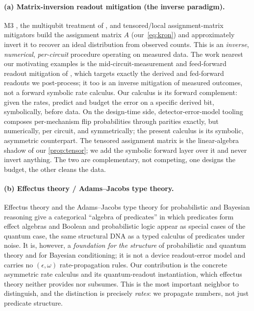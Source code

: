 \documentclass[a4paper,onecolumn,unpublished,nopdfoutputerror,allowtoday]{quantumarticle}
\numberwithin{equation}{section}
\theoremstyle{plain}
\theoremstyle{definition}
\theoremstyle{remark}
\newcommand{\eps}{\epsilon}
\begin{document}
\paragraph{(a) Matrix-inversion readout mitigation (the inverse paradigm).}
M3 \citep{nation2021m3}, the multiqubit treatment of
\citet{bravyi2021mitigating}, and tensored/local assignment-matrix mitigators
build the assignment matrix $A$ (our~\eqref{eq:kron}) and approximately invert it
to recover an ideal distribution from observed counts. This is an \emph{inverse},
\emph{numerical}, \emph{per-circuit} procedure operating on measured data. The
work nearest our motivating examples is the mid-circuit-measurement and
feed-forward readout mitigation of \citet{koh2024readout}, which targets exactly
the derived and fed-forward readouts we post-process; it too is an inverse
mitigation of measured outcomes, not a forward symbolic rate calculus. Our
calculus is its forward complement: given the rates, predict and budget the error
on a specific derived bit, symbolically, before data. On the design-time side,
detector-error-model tooling \citep{gidney2021stim} composes per-mechanism flip
probabilities through parities exactly, but numerically, per circuit, and
symmetrically; the present calculus is its symbolic, asymmetric counterpart.
The tensored assignment
matrix is the linear-algebra shadow of our \cref{prop:tensor}; we add the
symbolic forward layer over it and never invert anything. The two are
complementary, not competing, one designs the budget, the other cleans the
data.

\paragraph{(b) Effectus theory / Adams--Jacobs type theory.}
Effectus theory and the Adams--Jacobs type theory for probabilistic and Bayesian
reasoning \citep{cho2015effectus,adams2015typetheory} give a categorical
``algebra of predicates'' in which predicates form effect algebras and Boolean
and probabilistic logic appear as special cases of the quantum case, the same
structural DNA as a typed calculus of predicates under noise. It is, however, a
\emph{foundation for the structure} of probabilistic and quantum theory and for
Bayesian conditioning; it is not a device readout-error model and carries no
$(\eps,\omega)$ rate-propagation rules. Our contribution is the concrete
asymmetric rate calculus and its quantum-readout instantiation, which effectus
theory neither provides nor subsumes. This is the most important neighbor to
distinguish, and the distinction is precisely \emph{rates}: we propagate numbers,
not just predicate structure.
\end{document}
